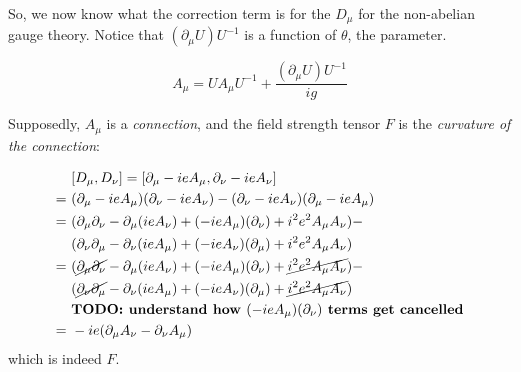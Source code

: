 So, we now know what the correction term is for the $D_\mu$ for the
non-abelian gauge theory. Notice that $(\partial_\mu U) U^{-1}$ is a function
of $\theta$, the parameter.

\begin{equation}
    \boxed{A_\mu  =   U A_\mu U^{-1} + \frac{(\partial_\mu U) U^{-1}}{i g}}
\end{equation}

Supposedly, $A_\mu$ is a \textit{connection}, and the field strength tensor
$F$ is the \textit{curvature of the connection}:

\begin{align*}
    &[D_\mu, D_\nu] = [\partial_\mu - i e A_\mu, \partial_\nu - i e A_\nu] \\
    =~&(\partial_\mu - i e A_\mu)(\partial_\nu - i e A_\nu) -  
    (\partial_\nu - i e A_\nu) (\partial_\mu - i e A_\mu) \\
    =~ %
    &(\partial_\mu \partial_\nu - \partial_\mu (i e A_\nu) +
    (- i e A_\mu) (\partial_\nu) + i^2 e^2 A_\mu A_\nu) - \\
    &(\partial_\nu \partial_\mu - \partial_\nu (i e A_\mu) +
    (- i e A_\nu)(\partial_\mu) + i^2 e^2 A_\mu A_\nu) \\
    =~ %
    &(\cancel{\partial_\mu \partial_\nu} - \partial_\mu (i e A_\nu) +
    (- i e A_\mu) (\partial_\nu) + \cancel{i^2 e^2 A_\mu A_\nu}) - \\
    &(\cancel{\partial_\nu \partial_\mu} - \partial_\nu (i e A_\mu) +
    (- i e A_\nu)(\partial_\mu) + \cancel{i^2 e^2 A_\mu A_\nu}) \\
    &\textbf{TODO: understand how $(- i e A_\mu) (\partial_\nu)$ terms get cancelled} \\
    =~&- i e (\partial_\mu A_\nu - \partial_\nu A_\mu)
\end{align*}
which is indeed $F$.
